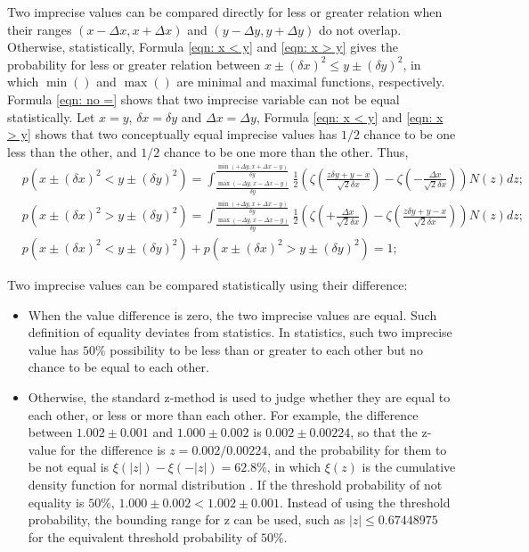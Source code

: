 \documentclass[twoside]{article}
\numberwithin{equation}{section}
\begin{document}
Two imprecise values can be compared directly for less or greater relation when their ranges $(x - \Delta x, x + \Delta x)$ and $(y - \Delta y, y + \Delta y)$ do not overlap. 
Otherwise, statistically, Formula \eqref{eqn: x < y} and \eqref{eqn: x > y} gives the probability for less or greater relation between $x \pm (\delta x)^2 \le y \pm (\delta y)^2$, in which $\min()$ and $\max()$ are minimal and maximal functions, respectively.
Formula \eqref{eqn: no =} shows that two imprecise variable can not be equal statistically.
Let $x = y$, $\delta x = \delta y$ and $\Delta x = \Delta y$, Formula \eqref{eqn: x < y} and \eqref{eqn: x > y} shows that two conceptually equal imprecise values has $1/2$ chance to be one less than the other, and $1/2$ chance to be one more than the other.
Thus,
\begin{align}
\label{eqn: x < y}
& p\left( x \pm (\delta x)^2 < y \pm (\delta y)^2 \right) = 
  \int_{\frac{\max(-\Delta y, x - \Delta x - y)}{\delta y}}^{\frac{\min(+\Delta y, x + \Delta x - y)}{\delta y}} 
      \frac{1}{2} \left(\zeta(\frac{z \delta y + y - x}{\sqrt{2} \delta x}) - \zeta(-\frac{\Delta x}{\sqrt{2} \delta x})\right) N(z) d z; \\
\label{eqn: x > y}
& p\left( x \pm (\delta x)^2 > y \pm (\delta y)^2 \right) =     
  \int_{\frac{\max(-\Delta y, x - \Delta x - y)}{\delta y}}^{\frac{\min(+\Delta y, x + \Delta x - y)}{\delta y}} 
      \frac{1}{2} \left(\zeta(+\frac{\Delta x}{\sqrt{2} \delta x}) - \zeta(\frac{z \delta y + y - x}{\sqrt{2} \delta x})\right) N(z) d z; \\
\label{eqn: no =}
& p\left( x \pm (\delta x)^2 < y \pm (\delta y)^2 \right) + p\left( x \pm (\delta x)^2 > y \pm (\delta y)^2 \right) = 1;
\end{align}

\fi

Two imprecise values can be compared statistically using their difference:
\begin{itemize}
\item When the value difference is zero, the two imprecise values are equal.  
Such definition of equality deviates from statistics.
In statistics, such two imprecise value has $50\%$ possibility to be less than or greater to each other but no chance to be equal to each other.

\item Otherwise, the standard z-method \cite{Probability_Statistics} is used to judge whether they are equal to each other, or less or more than each other.
For example, the difference between $1.002 \pm 0.001$ and $1.000 \pm 0.002$ is $0.002 \pm 0.00224$, so that the z-value for the difference is $z = 0.002 / 0.00224$, and the probability for them to be not equal is $\xi(|z|) - \xi(-|z|) = 62.8\%$, in which $\xi(z)$ is the cumulative density function for normal distribution \cite{Probability_Statistics}.
If the threshold probability of not equality is $50\%$, $1.000 \pm 0.002 < 1.002 \pm 0.001$.
Instead of using the threshold probability, the bounding range for z can be used, such as $|z| \leq 0.67448975$ for the equivalent threshold probability of $50\%$.
\end{itemize}
\end{document}

